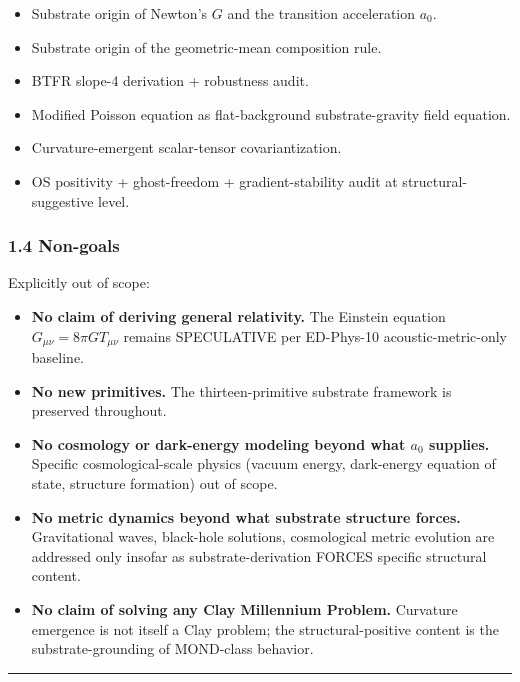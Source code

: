 \documentclass[
  11pt,a4paper]{article}
\providecommand{\tightlist}{%
  \setlength{\itemsep}{0pt}\setlength{\parskip}{0pt}}
\begin{document}
\begin{itemize}
\tightlist
\item
  Substrate origin of Newton's \(G\) and the transition acceleration
  \(a_0\).
\item
  Substrate origin of the geometric-mean composition rule.
\item
  BTFR slope-4 derivation + robustness audit.
\item
  Modified Poisson equation as flat-background substrate-gravity field
  equation.
\item
  Curvature-emergent scalar-tensor covariantization.
\item
  OS positivity + ghost-freedom + gradient-stability audit at
  structural-suggestive level.
\end{itemize}

\subsubsection{1.4 Non-goals}\label{non-goals}

Explicitly out of scope:

\begin{itemize}
\tightlist
\item
  \textbf{No claim of deriving general relativity.} The Einstein
  equation \(G_{\mu\nu} = 8\pi G T_{\mu\nu}\) remains SPECULATIVE per
  ED-Phys-10 acoustic-metric-only baseline.
\item
  \textbf{No new primitives.} The thirteen-primitive substrate framework
  is preserved throughout.
\item
  \textbf{No cosmology or dark-energy modeling beyond what \(a_0\)
  supplies.} Specific cosmological-scale physics (vacuum energy,
  dark-energy equation of state, structure formation) out of scope.
\item
  \textbf{No metric dynamics beyond what substrate structure forces.}
  Gravitational waves, black-hole solutions, cosmological metric
  evolution are addressed only insofar as substrate-derivation FORCES
  specific structural content.
\item
  \textbf{No claim of solving any Clay Millennium Problem.} Curvature
  emergence is not itself a Clay problem; the structural-positive
  content is the substrate-grounding of MOND-class behavior.
\end{itemize}

\begin{center}\rule{0.5\linewidth}{0.5pt}\end{center}
\end{document}
